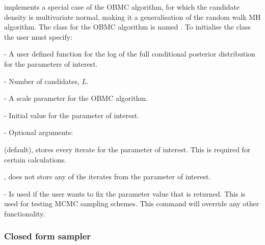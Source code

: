 \documentclass[article]{jss}
\begin{document}
 implements a special case of the OBMC algorithm, for
which the candidate density is multivariate normal, making it a
generalisation of the random walk MH algorithm. The class for the OBMC
algorithm is named . To initialise the class the user must
specify:
\begin{description}
\item {} - A user defined function for the log of the full
  conditional posterior distribution for the parameters of interest.
\item {} - Number of candidates, $L$.
\item {} - A scale parameter for the OBMC algorithm.
\item {} - Initial value for the parameter of interest. 
\item {} - Optional arguments:

  \begin{description}
  \item {}
    \begin{description}
    \item {} (default), stores every iterate for the
      parameter of interest. This is required for certain
      calculations.
    \item {}, does not store any of the iterates from the
      parameter of interest.
      \end{description}
    \item {} - Is used if the user wants to fix
      the parameter value that is returned. This is used for testing
      MCMC sampling schemes.  This command will override any other
      functionality.
  \end{description}
\end{description}

\subsubsection{Closed form sampler}
\end{document}
